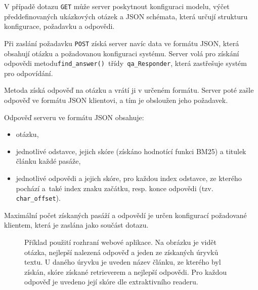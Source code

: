 V případě dotazu \texttt{GET} může server poskytnout konfiguraci modelu, výčet předdefinovaných ukázkových otázek a JSON schémata, která určují strukturu konfigurace, požadavku a odpovědi.\par
Při zaslání požadavku \texttt{POST} získá server navíc data ve formátu JSON, která obsahují otázku a požadovanou konfiguraci systému. Server volá pro získání odpovědi metodu\linebreak \texttt{find\_answer() }třídy\texttt{ qa\_Responder}, která zastřešuje systém pro odpovídání.\par
\noindent Metoda získá odpověď na otázku a vrátí ji v určeném formátu. Server poté zašle odpověď ve formátu JSON klientovi, a tím je obsloužen jeho požadavek.\par
\noindent Odpověď serveru ve formátu JSON obsahuje: 
\begin{itemize}
\itemsep-0.1em 
    \item otázku,
    \item jednotlivé odstavce, jejich skóre (získáno hodnotící funkci BM25) a titulek článku každé pasáže,
    \item jednotlivé odpovědi a jejich skóre, pro každou index odstavce, ze kterého pochází a~také index znaku začátku, resp. konce odpovědi (tzv. \texttt{char\_offset}).
\end{itemize}
Maximální počet získaných pasáží a odpovědí je určen konfigurací požadované klientem, která je zaslána jako součást dotazu.
\medskip
\begin{figure}[hbt]
	\centering
	\caption{Příklad použití rozhraní webové aplikace. Na obrázku je vidět otázka, nejlepší nalezená odpověď a jeden ze získaných úryvků textu. U daného úryvku je uveden název článku, ze kterého byl získán, skóre získané retrieverem a nejlepší odpovědi. Pro každou odpověď je uvedeno její skóre dle extraktivního readeru.}
	\label{UI1_example}
\end{figure}

